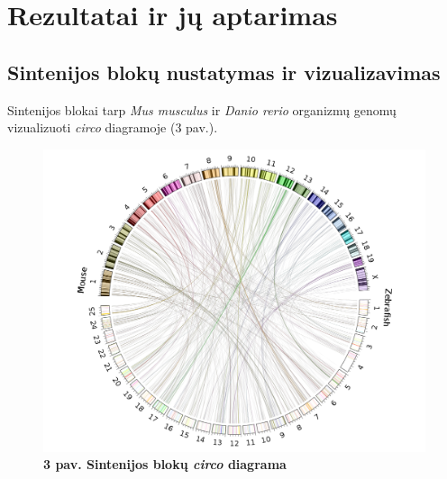 \documentclass[12pt]{article}
\begin{document}






\newpage


\section{Rezultatai ir jų aptarimas}
\subsection{Sintenijos blokų nustatymas ir vizualizavimas}

Sintenijos blokai tarp \emph{Mus musculus} ir \emph{Danio rerio} organizmų
genomų vizualizuoti \emph{circo} diagramoje (3 pav.).

\begin{figure}[htb]
    \begin{center}
        \includegraphics[width=0.8\linewidth]{../Figures/SynCircos.png}
        \vspace{-1\baselineskip}
        \caption*{\small\textbf{3 pav. Sintenijos blokų \emph{circo}
        diagrama}}
        \label{fig:birds}
    \end{center}
\end{figure}
\end{document}
